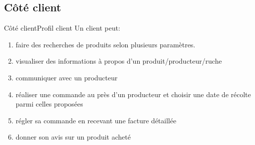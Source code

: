 \documentclass[usenames,dvipsnames]{beamer}
\begin{document}
\subsection{Côté client}
  \begin{frame}{Côté client}{Profil client}
    Un client peut:
    \begin{enumerate}
      \item faire des recherches de produits selon plusieurs paramètres.
      \item visualiser des informations à propos d'un produit/producteur/ruche
      \item communiquer avec un producteur
      \item réaliser une commande au près d'un producteur et choisir une date de récolte parmi celles proposées
      \item régler sa commande en recevant une facture détaillée
      \item donner son avis sur un produit acheté
    \end{enumerate}
  \end{frame}

\end{document}
